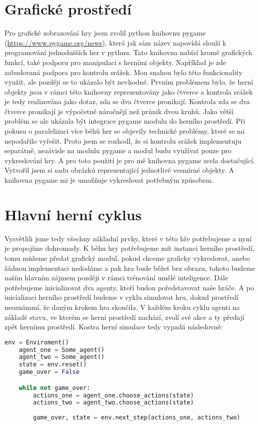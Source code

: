 \section{Grafické prostředí}
Pro grafické zobrazování hry jsem zvolil python knihovnu pygame (\url{https://www.pygame.org/news}), která jak sám název napovídá slouží k programování jednodušších her v pythnu.
Tato knihovna nabízí kromě grafických funkcí, také podporu pro manipulaci s herními objekty. Například je zde zabudovaná podpora pro kontrolu srážek.
Mou snahou bylo této funkcionality využít, ale později se to ukázalo být nevhodné.
Prvním problémem bylo, že herní objekty jsou v rámci této knihovny reprezentovány jako čtverce a kontrola srážek je tedy realizována jako dotaz, zda se dva čtverce pronikají.
Kontrola zda se dva čtverce pronikají je výpočetně náročnějí než průnik dvou kruhů.
Jako větší problém se ale ukázala být integrace pygame modulu do herního prostředí. Při pokusu o paralelizaci více běhů her se objevily technické problémy, které se mi nepodařilo vyřešit.
Proto jsem se rozhodl, že si kontrolu srážek implementuju separátně, nezávisle na modulu pygame a modul budu využívat pouze pro vykreslování hry.
A pro toto použití je pro mě knihovna pygame zcela dostačující. Vytvořil jsem si sadu obrázků reprezentující jednotlivé vesmírné objekty. A knihovna pygame mi je umožňuje vykreslovat potřebným způsobem.


\section{Hlavní herní cyklus}
Vysvětlili jsme tedy všechny základní prvky, které v této hře potřebujeme a nyní je propojíme dohromady.
K běhu hry potřebujeme mít instanci herního prostředí, tomu můžeme předat grafický modul, pokud chceme graficky vykreslovat, anebo žádnou implementaci nedodáme a pak hra bude běžet bez obrazu,
tohoto budeme naším hlavním zájmem později v rámci trénování umělé inteligence.
Dále potřebujeme inicializovat dva agenty, kteří budou poředstavovat naše hráče. A po inicializaci herního prostředí budeme v cyklu simulovat hru, dokud prostředí neoznámmí, že daným krokem hra skončila.
V každém kroku cyklu agenti na základě stavu, ve kterém se herní prostředí nachází, zvolí své akce a ty předají zpět hernímu prostředí.
Kostra herní simulace tedy vypadá následovně:

\begin{lstlisting}[language=Python]
    env = Enviroment()
    agent_one = Some_agent()
    agent_two = Some_agent()    
    state = env.reset()
    game_over = False

    while not game_over:
        actions_one = agent_one.choose_actions(state)    
        actions_two = agent_two.choose_actions(state)
        
        game_over, state = env.next_step(actions_one, actions_two)
\end{lstlisting}